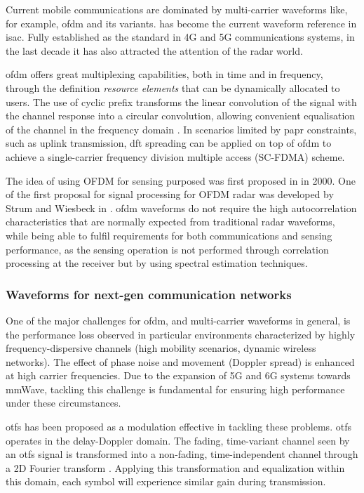 	Current mobile communications are dominated by multi-carrier waveforms like, for example, \gls{ofdm} and its variants.
	 has become the current waveform reference in \gls{isac}. Fully established as the standard in 4G and 5G communications systems, in the last decade it has also attracted the attention of the radar world.
	
	\gls{ofdm} offers great multiplexing capabilities, both in time and in frequency, through the definition \textit{resource elements} that can be dynamically allocated to users. The use of cyclic prefix transforms the linear convolution of the signal with the channel response into a circular convolution, allowing convenient equalisation of the channel in the frequency domain \cite{Wild_Grudnitsky_Mandelli_Henninger_Guan_Schaich_2023}. In scenarios limited by \gls{papr} constraints, such as uplink transmission, \gls{dft} spreading can  be applied on top of \gls{ofdm} to achieve a single-carrier frequency division multiple access (SC-FDMA) scheme.
	
	The idea of using OFDM for sensing purposed was first proposed in \cite{Levanon_ofdm} in 2000. One of the first proposal for signal processing for OFDM radar was developed by Strum and Wiesbeck in \cite{Sturm_Wiesbeck_2011}.
	\gls{ofdm} waveforms do not require the high autocorrelation characteristics that are normally expected from traditional radar waveforms, while being able to fulfil requirements for both communications and sensing performance, as the sensing operation is not performed through correlation processing at the receiver but by using spectral estimation techniques.
	
	
	\subsubsection{Waveforms for next-gen communication networks}
	
	One of the major challenges for \gls{ofdm}, and multi-carrier waveforms in general, is the performance loss observed in particular environments characterized by highly frequency-dispersive channels (\eg high mobility scenarios, dynamic wireless networks).
	The effect of phase noise and movement (Doppler spread) is enhanced at high carrier frequencies. 
	Due to the expansion of 5G and 6G systems towards mmWave, tackling this challenge is fundamental for ensuring high performance under these circumstances.
	
	\Gls{otfs} has been proposed as a modulation effective in tackling these problems. \Gls{otfs} operates in the delay-Doppler domain. 
	The fading, time-variant channel seen by an \gls{otfs} signal is transformed into a non-fading, time-independent channel through a 2D Fourier transform \cite{OTFS_Hadani_2017}. 
	Applying this transformation and equalization within this domain, each symbol will experience similar gain during transmission.
	
